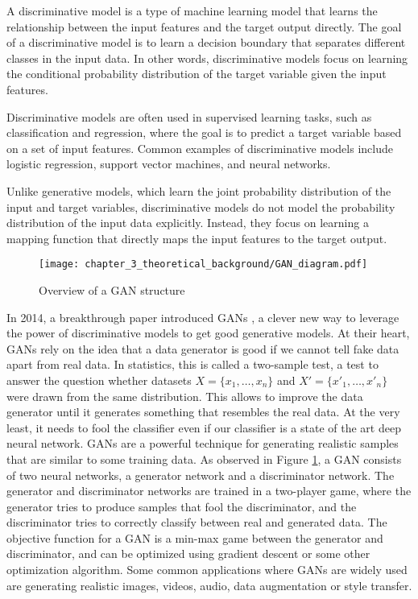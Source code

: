 A discriminative model is a type of machine learning model that learns the relationship between the input features and the target output directly. The goal of a discriminative model is to learn a decision boundary that separates different classes in the input data. In other words, discriminative models focus on learning the conditional probability distribution of the target variable given the input features.

Discriminative models are often used in supervised learning tasks, such as classification and regression, where the goal is to predict a target variable based on a set of input features. Common examples of discriminative models include logistic regression, support vector machines, and neural networks.

Unlike generative models, which learn the joint probability distribution of the input and target variables, discriminative models do not model the probability distribution of the input data explicitly. Instead, they focus on learning a mapping function that directly maps the input features to the target output.

\begin{figure}[h]
	\centering
	\texttt{[image: chapter\_3\_theoretical\_background/GAN\_diagram.pdf]}
	\caption{Overview of a \ac{GAN} structure}
	\label{fig:chapter_3_theoretical_background/GAN}
\end{figure}

In 2014, a breakthrough paper introduced \acfp{GAN} \cite{goodfellow2020generative}, a clever new way to leverage the power of discriminative models to get good generative models. At their heart, \acp{GAN} rely on the idea that a data generator is good if we cannot tell fake data apart from real data. In statistics, this is called a two-sample test, a test to answer the question whether datasets $X=\{x_1,\ldots, x_n\}$ and $X'=\{x'_1,\ldots, x'_n\}$ were drawn from the same distribution. This allows to improve the data generator until it generates something that resembles the real data. At the very least, it needs to fool the classifier even if our classifier is a state of the art deep neural network. \acp{GAN} are a powerful technique for generating realistic samples that are similar to some training data. As observed in Figure \ref{fig:chapter_3_theoretical_background/GAN}, a \ac{GAN} consists of two neural networks, a generator network and a discriminator network. The generator and discriminator networks are trained in a two-player game, where the generator tries to produce samples that fool the discriminator, and the discriminator tries to correctly classify between real and generated data. The objective function for a \ac{GAN} is a min-max game between the generator and discriminator, and can be optimized using gradient descent or some other optimization algorithm. Some common applications where \acp{GAN} are widely used are generating realistic images, videos, audio, data augmentation or style transfer.

